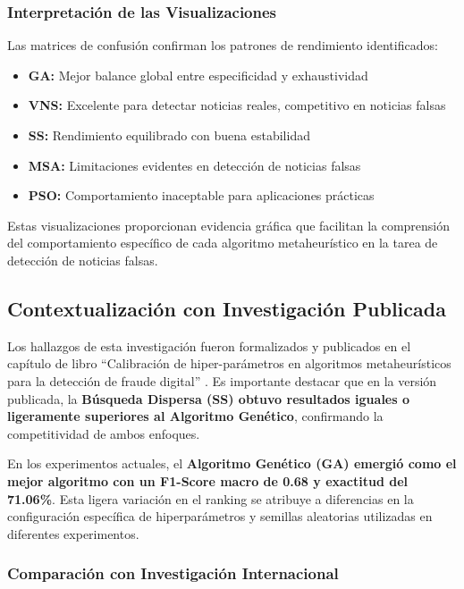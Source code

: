 \newpage

\subsubsection{Interpretación de las Visualizaciones}

Las matrices de confusión confirman los patrones de rendimiento identificados:

\begin{itemize}
    \item \textbf{GA:} Mejor balance global entre especificidad y exhaustividad
    \item \textbf{VNS:} Excelente para detectar noticias reales, competitivo en noticias falsas
    \item \textbf{SS:} Rendimiento equilibrado con buena estabilidad
    \item \textbf{MSA:} Limitaciones evidentes en detección de noticias falsas
    \item \textbf{PSO:} Comportamiento inaceptable para aplicaciones prácticas
\end{itemize}

Estas visualizaciones proporcionan evidencia gráfica que facilitan la comprensión del comportamiento específico de cada algoritmo metaheurístico en la tarea de detección de noticias falsas.

\subsection{Contextualización con Investigación Publicada}
\label{subsec:contextualizacion_investigacion}

Los hallazgos de esta investigación fueron formalizados y publicados en el capítulo de libro ``Calibración de hiper-parámetros en algoritmos metaheurísticos para la detección de fraude digital'' \cite{hurtado2024calibracion}. Es importante destacar que en la versión publicada, la \textbf{Búsqueda Dispersa (SS) obtuvo resultados iguales o ligeramente superiores al Algoritmo Genético}, confirmando la competitividad de ambos enfoques.

En los experimentos actuales, el \textbf{Algoritmo Genético (GA) emergió como el mejor algoritmo con un F1-Score macro de 0.68 y exactitud del 71.06\%}. Esta ligera variación en el ranking se atribuye a diferencias en la configuración específica de hiperparámetros y semillas aleatorias utilizadas en diferentes experimentos.

\subsubsection{Comparación con Investigación Internacional}

